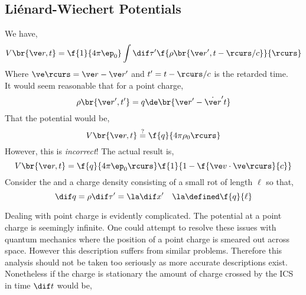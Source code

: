 \documentclass{article}
\begin{document}

\subsection{Liénard-Wiechert Potentials}

We have,
\[ V\br{\ve r, t} = \f{1}{4 \pi \ep_0} \int \dif \tau' \f{\rho\br{\ve r', t - \rcurs/c}}{\rcurs} \]
Where $\ve \rcurs = \ve r - \ve r'$ and $t' = t - \rcurs/c$ is the retarded time.\\

It would seem reasonable that for a point charge,
\[ \rho\br{\ve r', t'} = q \de\br{\ve r' - \dot{\ve r}' t} \]
That the potential would be,
\[ V\br{\ve r, t} \stackrel{?}{=} \f{q}{4 \pi \rho_0 \rcurs} \]
However, this is \textit{incorrect}! The actual result is,
\[ V\br{\ve r, t} = \f{q}{4 \pi \ep_0 \rcurs} \f{1}{1 - \f{\ve v \cdot \ve \rcurs}{c}} \]
Consider the  and a charge density consisting of a small rot of length $\ell$ so that,
\[ \dif q = \rho \dif \tau' = \la \dif x' \quad \la \defined \f{q}{\ell} \]
\begin{center}
\end{center}
Dealing with point charge is evidently complicated. The potential at a point charge is seemingly infinite. One could attempt to resolve these issues with quantum mechanics where the position of a point charge is smeared out across space. However this description suffers from similar problems. Therefore this analysis should not be taken too seriously as more accurate descriptions exist. Nonetheless if the charge is stationary the amount of charge crossed by the ICS in time $\dif t$ would be,
\end{document}
